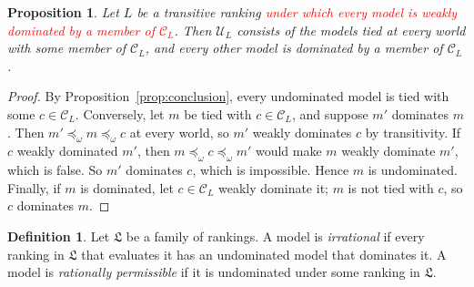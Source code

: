 \documentclass[11pt]{article}
\newtheorem{proposition}[theorem]{Proposition}
\theoremstyle{definition}
\newtheorem{definition}[theorem]{Definition}
\newcommand{\C}{\mathcal C}
\newcommand{\U}{\mathcal U}
\newcommand{\Lf}{\mathfrak L}
\newcommand{\new}[1]{\textcolor{red}{#1}}
\begin{document}
\begin{proposition}\label{prop:profiles}
Let $L$ be a transitive ranking \new{under which every model is weakly dominated by a member of $\C_L$}. Then $\U_L$ consists of the models tied at every world with some member of $\C_L$, and every other model is dominated by a member of $\C_L$.
\end{proposition}
\begin{proof}
By Proposition~\ref{prop:conclusion}, every undominated model is tied with some $c\in\C_L$. Conversely, let $m$ be tied with $c\in\C_L$, and suppose $m'$ dominates $m$. Then $m'\preceq_\omega m\preceq_\omega c$ at every world, so $m'$ weakly dominates $c$ by transitivity. If $c$ weakly dominated $m'$, then $m\preceq_\omega c\preceq_\omega m'$ would make $m$ weakly dominate $m'$, which is false. So $m'$ dominates $c$, which is impossible. Hence $m$ is undominated. Finally, if $m$ is dominated, let $c\in\C_L$ weakly dominate it; $m$ is not tied with $c$, so $c$ dominates $m$.
\end{proof}

\begin{definition}\label{def:permissibility}
Let $\Lf$ be a family of rankings. A model is \emph{irrational} if every ranking in $\Lf$ that evaluates it has an undominated model that dominates it. A model is \emph{rationally permissible} if it is undominated under some ranking in $\Lf$.
\end{definition}
\end{document}
